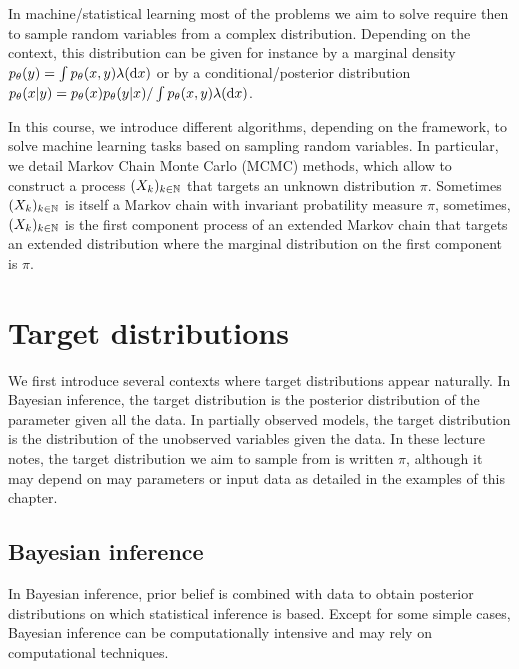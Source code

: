 \documentclass[english,graybox,envcountchap,envcountsame,sectrefs,shortlabels]{svmono}
\theoremstyle{style}
\begin{document}
In machine/statistical learning most of the problems we aim to solve require then to sample random variables from a complex distribution. Depending on the context, this distribution can be given for instance by a marginal density $p_\theta(y) = \int p_\theta(x,y) \lambda(\mathrm{d} x)$ or by a conditional/posterior distribution $p_\theta(x|y) = p_\theta(x)p_\theta(y|x)/\int p_\theta(x,y) \lambda(\mathrm{d} x)$.

 In this course, we introduce different algorithms, depending on the framework, to solve machine learning tasks based on sampling random variables.  In particular, we detail Markov Chain Monte Carlo (MCMC) methods, which allow to construct a process $(X_k)_{k\in\mathbb{N}}$ that targets an unknown distribution $\pi$. Sometimes $(X_k)_{k\in\mathbb{N}}$ is itself a Markov chain with invariant probatility measure $\pi$, sometimes, $(X_k)_{k\in\mathbb{N}}$ is the first component process of an extended Markov chain that targets an extended distribution where the marginal distribution on the first component is $\pi$.


\section{Target distributions}
We first introduce several contexts where target distributions appear naturally. In Bayesian inference, the target distribution is the posterior distribution of the parameter given all the data. In partially observed models, the target distribution is the distribution of the unobserved variables given the data. In these lecture notes, the target distribution we aim to sample from is written $\pi$, although it may depend on may parameters or input data as detailed in the examples of this chapter.

\subsection{Bayesian inference}
In  Bayesian inference, prior belief  is combined with
data to obtain posterior distributions on which statistical inference is based.
Except for some simple cases, Bayesian inference can be computationally
intensive and may rely on  computational techniques.
\end{document}
